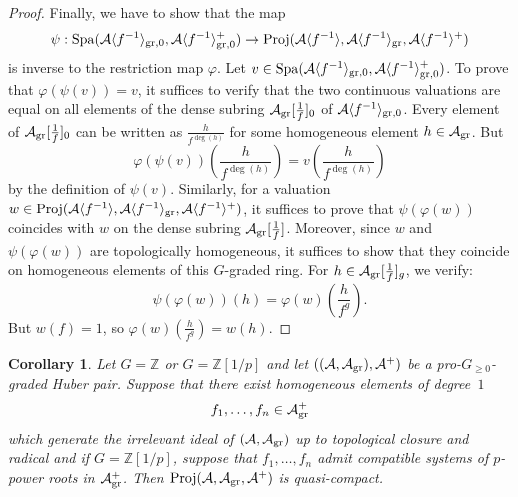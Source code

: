 \documentclass[12pt,twoside,a4paper]{article}
\newtheorem{cor}[thm]{Corollary}
\theoremstyle{definition}
\theoremstyle{remark}
\newcommand\gr{{\rm gr}}
\newcommand\Proj{{\rm Proj}}
\newcommand\Spa{{\rm Spa}}
\begin{document}
\begin{proof}
Finally, we have to show that the map \begin{equation*}\psi: \Spa(\mathcal{A}\langle f^{-1}\rangle_{\gr,0}, \mathcal{A}\langle f^{-1}\rangle_{\gr,0}^{+})\to \Proj(\mathcal{A}\langle f^{-1}\rangle, \mathcal{A}\langle f^{-1}\rangle_{\gr}, \mathcal{A}\langle f^{-1}\rangle^{+})\end{equation*}is inverse to the restriction map $\varphi$. Let $v\in \Spa(\mathcal{A}\langle f^{-1}\rangle_{\gr,0}, \mathcal{A}\langle f^{-1}\rangle_{\gr,0}^{+})$. To prove that $\varphi(\psi(v))=v$, it suffices to verify that the two continuous valuations are equal on all elements of the dense subring $\mathcal{A}_{\gr}[\frac{1}{f}]_{0}$ of $\mathcal{A}\langle f^{-1}\rangle_{\gr,0}$. Every element of $\mathcal{A}_{\gr}[\frac{1}{f}]_{0}$ can be written as $\frac{h}{f^{\deg(h)}}$ for some homogeneous element $h\in \mathcal{A}_{\gr}$. But \begin{equation*}\varphi(\psi(v))(\frac{h}{f^{\deg(h)}})=v(\frac{h}{f^{\deg(h)}})\end{equation*}by the definition of $\psi(v)$. Similarly, for a valuation $w\in \Proj(\mathcal{A}\langle f^{-1}\rangle, \mathcal{A}\langle f^{-1}\rangle_{\gr}, \mathcal{A}\langle f^{-1}\rangle^{+})$, it suffices to prove that $\psi(\varphi(w))$ coincides with $w$ on the dense subring $\mathcal{A}_{\gr}[\frac{1}{f}]$. Moreover, since $w$ and $\psi(\varphi(w))$ are topologically homogeneous, it suffices to show that they coincide on homogeneous elements of this $G$-graded ring. For $h\in \mathcal{A}_{\gr}[\frac{1}{f}]_{g}$, we verify: \begin{equation*}\psi(\varphi(w))(h)=\varphi(w)(\frac{h}{f^{g}}).\end{equation*}But $w(f)=1$, so $\varphi(w)(\frac{h}{f^{g}})=w(h)$. \end{proof}
\begin{cor}\label{Topological space 2}Let $G=\mathbb{Z}$ or $G=\mathbb{Z}[1/p]$ and let $((\mathcal{A}, \mathcal{A}_{\gr}), \mathcal{A}^{+})$ be a pro-$G_{\geq0}$-graded Huber pair. Suppose that there exist homogeneous elements of degree~$1$ \begin{equation*}f_1,\dots, f_{n}\in \mathcal{A}_{\gr}^{+}\end{equation*}which generate the irrelevant ideal of $(\mathcal{A}, \mathcal{A}_{\gr})$ up to topological closure and radical and if $G=\mathbb{Z}[1/p]$, suppose that $f_1,\dots, f_n$ admit compatible systems of $p$-power roots in $\mathcal{A}_{\gr}^{+}$. Then $\Proj(\mathcal{A}, \mathcal{A}_{\gr}, \mathcal{A}^{+})$ is quasi-compact.\end{cor}
\end{document}
